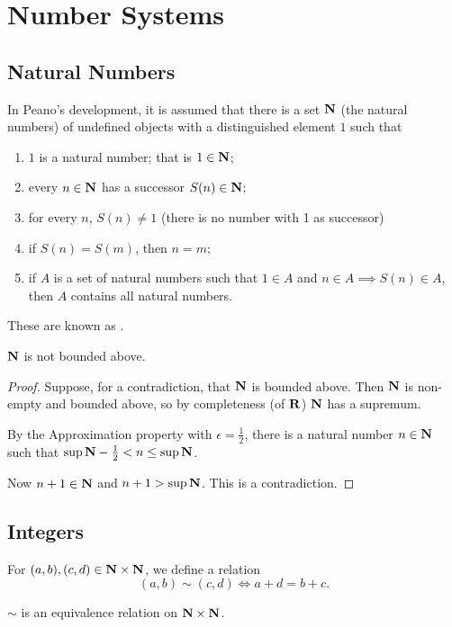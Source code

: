 \chapter{Number Systems}\label{chap:number-systems}
\section{Natural Numbers}
In Peano's development, it is assumed that there is a set $\mathbf N$ (the natural numbers) of undefined objects with a distinguished element $1$ such that
\begin{enumerate}[label=(\roman*)]
\item $1$ is a natural number; that is $1\in\mathbf N$;
\item every $n\in\mathbf N$ has a successor $S(n)\in\mathbf N$;
\item for every $n$, $S(n)\neq1$ (there is no number with 1 as successor)
\item if $S(n)=S(m)$, then $n=m$;
\item if $A$ is a set of natural numbers such that $1\in A$ and $n\in A\implies S(n)\in A$, then $A$ contains all natural numbers.
\end{enumerate}
These are known as .

\begin{theorem}
$\mathbf N$ is not bounded above.
\end{theorem}

\begin{proof}
Suppose, for a contradiction, that $\mathbf N$ is bounded above. Then $\mathbf N$ is non-empty and bounded above, so by completeness (of $\mathbf R$) $\mathbf N$ has a supremum.

By the Approximation property with $\epsilon=\frac{1}{2}$, there is a natural number $n\in\mathbf N$ such that $\sup\mathbf N-\frac{1}{2}<n\le\sup\mathbf N$.

Now $n+1\in\mathbf N$ and $n+1>\sup\mathbf N$. This is a contradiction.
\end{proof}
\pagebreak

\section{Integers}
\begin{definition}
For $(a,b),(c,d)\in\mathbf N\times\mathbf N$, we define a relation
\[(a,b)\sim(c,d)\iff a+d=b+c.\]
\end{definition}

\begin{proposition}
$\sim$ is an equivalence relation on $\mathbf N\times\mathbf N$.
\end{proposition}

